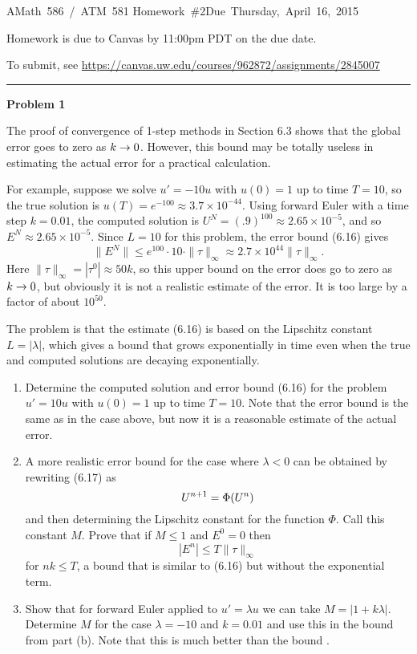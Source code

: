 \documentclass[10pt]{article}
\begin{document}
\hfill\vbox{\hbox{AMath 586 / ATM 581}
\hbox{Homework \#2}\hbox{Due Thursday, April 16, 2015}}

\vskip 5pt

Homework is due to Canvas by 11:00pm PDT on the due date.

To submit, see \url{https://canvas.uw.edu/courses/962872/assignments/2845007}


\vskip 1cm
\hrule
{\bf Problem 1}


The proof of convergence of 1-step methods in Section 6.3 shows that the 
global error goes to zero as $k\rightarrow 0$.
However, this bound may be totally useless in estimating the actual error
for a practical calculation.

For example, suppose we solve $u'=-10u$ with $u(0)=1$ up to time $T=10$, so
the true solution is $u(T)=e^{-100} \approx 3.7\times 10^{-44}$.
Using forward Euler with a time step $k=0.01$,  
the computed solution is $U^N = (.9)^{100}\approx 2.65 \times
10^{-5}$, and so $E^N \approx 2.65 \times 10^{-5}$.
Since $L=10$ for this problem, the error bound (6.16) gives
\begin{equation}\label{eq:1}
\|E^N\| \leq e^{100}\cdot 10 \cdot \|\tau \|_\infty \approx 2.7 \times
10^{44} \|\tau\|_\infty.
\end{equation} 
Here $\|\tau\|_\infty =|\tau^0| \approx 50 k$, so this upper bound on the
error does go to zero as $k\rightarrow 0$, but obviously it is not a realistic
estimate of the error. It is too large by a factor of about $10^{50}$.

The problem is that the estimate (6.16) is based on the Lipschitz
constant $L=|\lambda|$, which gives a bound that grows exponentially in time
even when the true and computed solutions are decaying exponentially.

\begin{enumerate}
\item Determine the computed solution and error bound (6.16) for the problem
$u' = 10u$ with $u(0)=1$ up to time $T=10$.  Note that the error bound is
the same as in the case above, but now it is a reasonable estimate of the
actual error.

\item A more realistic error bound for the case where $\lambda<0$ can be
obtained by rewriting (6.17) as
\[
U^{n+1} = \Phi(U^n)
\]
and then determining the Lipschitz constant for the function $\Phi$.
Call this constant $M$.  Prove that if $M\leq 1$  and $E^0=0$ then
\[
|E^n| \leq  T\|\tau\|_\infty
\]
for $nk\leq T$, a bound that is similar to (6.16) but without the
exponential term.


\item Show that for forward Euler applied to $u'=\lambda
u$ we can take $M = |1+k\lambda|$.  Determine $M$ for the case $\lambda =
-10$ and $k=0.01$ and use this in the bound from part (b).
Note that this is much better than the bound .

\end{enumerate}
\end{document}
